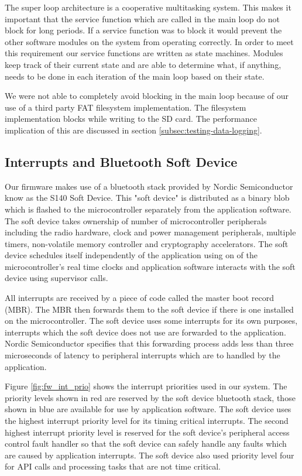 The super loop architecture is a cooperative multitasking system. This makes it
important that the service function which are called in the main loop do not
block for long periods. If a service function was to block it would prevent the
other software modules on the system from operating correctly. In order to meet
this requirement our service functions are written as state machines. Modules
keep track of their current state and are able to determine what, if anything,
needs to be done in each iteration of the main loop based on their state.

We were not able to completely avoid blocking in the main loop because of our
use of a third party FAT filesystem implementation. The filesystem implementation
blocks while writing to the SD card. The performance implication of this are
discussed in section \ref{subsec:testing-data-logging}.

\subsection{Interrupts and Bluetooth Soft Device}

Our firmware makes use of a bluetooth stack provided by Nordic Semiconductor
know as the S140 Soft Device. This "soft device" is distributed as a binary
blob which is flashed to the microcontroller separately from the application
software. The soft device takes ownership of number of microcontroller
peripherals including the radio hardware, clock and power management peripherals,
multiple timers, non-volatile memory controller and cryptography accelerators.
The soft device schedules itself independently of the application using on of
the microcontroller's real time clocks and application software interacts with
the soft device using supervisor calls.

All interrupts are received by a piece of code called the master boot record
(MBR). The MBR then forwards them to the soft device if there is one installed
on the microcontroller. The soft device uses some interrupts for its own
purposes, interrupts which the soft device does not use are forwarded to the
application. Nordic Semiconductor specifies that this forwarding process adds
less than three microseconds of latency to peripheral interrupts which are to
handled by the application.

Figure \ref{fig:fw_int_prio} shows the interrupt priorities used in our system.
The priority levels shown in red are reserved by the soft device bluetooth
stack, those shown in blue are available for use by application software. The
soft device uses the highest interrupt priority level for its timing critical
interrupts. The second highest interrupt priority level is reserved for the
soft device's peripheral access control fault handler so that the soft device
can safely handle any faults which are caused by application interrupts. The
soft device also used priority level four for API calls and processing tasks
that are not time critical.


